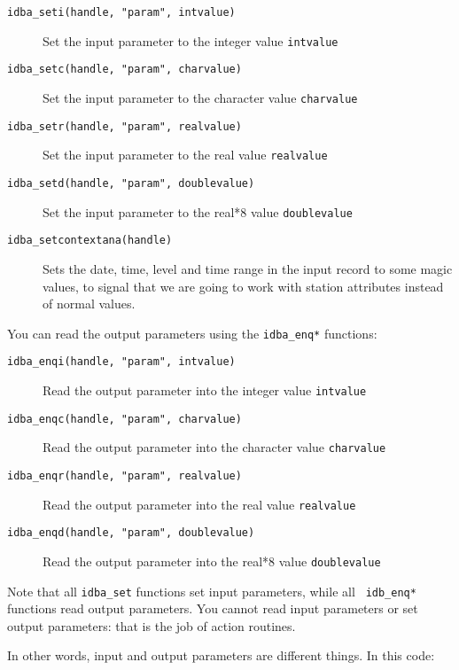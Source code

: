 \documentclass[final,12pt,a4paper,twoside]{book}
\begin{document}
\begin{description}
\item[{\tt idba\_seti(handle, "param", intvalue)}]
  Set the input parameter to the integer value {\tt intvalue}

\item[{\tt idba\_setc(handle, "param", charvalue)}]
  Set the input parameter to the character value {\tt charvalue}

\item[{\tt idba\_setr(handle, "param", realvalue)}]
  Set the input parameter to the real value {\tt realvalue}

\item[{\tt idba\_setd(handle, "param", doublevalue)}]
  Set the input parameter to the real*8 value {\tt doublevalue}

\item[{\tt idba\_setcontextana(handle)}]
  \label{fun-setcontextana}
  Sets the date, time, level and time range in the input record to some magic
  values, to signal that we are going to work with station attributes instead
  of normal values.
\end{description}

You can read the output parameters using the {\tt idba\_enq*} functions:
\label{fun-idba_enq}

\begin{description}
\item[{\tt idba\_enqi(handle, "param", intvalue)}]
  Read the output parameter into the integer value {\tt intvalue}

\item[{\tt idba\_enqc(handle, "param", charvalue)}]
  Read the output parameter into the character value {\tt charvalue}

\item[{\tt idba\_enqr(handle, "param", realvalue)}]
  Read the output parameter into the real value {\tt realvalue}

\item[{\tt idba\_enqd(handle, "param", doublevalue)}]
  Read the output parameter into the real*8 value {\tt doublevalue}
\end{description}

Note that all {\tt idba\_set} functions set input parameters, while all {\tt
idb\_enq*} functions read output parameters.  You cannot read input parameters
or set output parameters: that is the job of action routines.

In other words, input and output parameters are different things.  In this
code:
\end{document}

